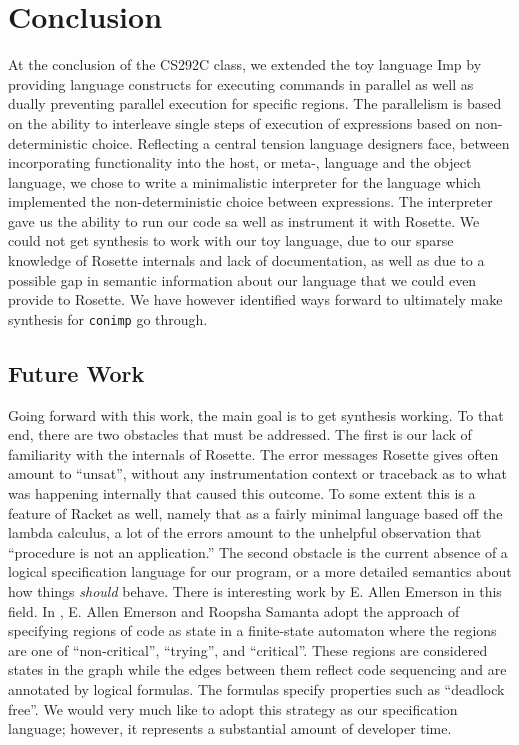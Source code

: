 \section{Conclusion}
At the conclusion of the CS292C class, we extended the toy language Imp by providing language constructs for executing commands in parallel as well as dually preventing parallel execution for specific regions.  The parallelism is based on the ability to interleave single steps of execution of expressions based on non-deterministic choice.  Reflecting a central tension language designers face, between incorporating functionality into the host, or meta-, language and the object language, we chose to write a minimalistic interpreter for the language which implemented the non-deterministic choice between expressions.  The interpreter gave us the ability to run our code sa well as instrument it with Rosette.  We could not get synthesis to work with our toy language, due to our sparse knowledge of Rosette internals and lack of documentation, as well as due to a possible gap in semantic information about our language that we could even provide to Rosette.  We have however identified ways forward to ultimately make synthesis for \texttt{conimp} go through.

\subsection{Future Work}
Going forward with this work, the main goal is to get synthesis working.  To that end, there are two obstacles that must be addressed.  The first is our lack of familiarity with the internals of Rosette.  The error messages Rosette gives often amount to ``unsat'', without any instrumentation context or traceback as to what was happening internally that caused this outcome.  To some extent this is a feature of Racket as well, namely that as a fairly minimal language based off the lambda calculus, a lot of the errors amount to the unhelpful observation that ``procedure is not an application.''  The second obstacle is the current absence of a logical specification language for our program, or a more detailed semantics about how things {\em should} behave.  There is interesting work by E. Allen Emerson in this field.  In \cite{emerson2011}, E. Allen Emerson and Roopsha Samanta adopt the approach of specifying regions of code as state in a finite-state automaton where the regions are one of ``non-critical'', ``trying'', and ``critical''.  These regions are considered states in the graph while the edges between them reflect code sequencing and are annotated by logical formulas.  The formulas specify properties such as ``deadlock free''.  We would very much like to adopt this strategy as our specification language; however, it represents a substantial amount of developer time.

